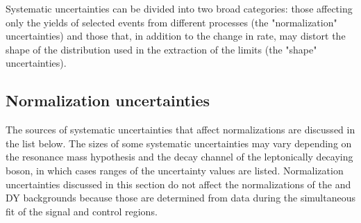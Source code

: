 Systematic uncertainties can be divided into two broad categories:
those affecting only the yields of selected events from different processes
(the "normalization" uncertainties) and those that, in addition to the change in rate, may
distort the shape of the \mTHH distribution used in the extraction of
the limits (the "shape" uncertainties). %

\subsection{Normalization uncertainties}


The sources of systematic
uncertainties that affect normalizations are discussed in the list below. The sizes of some
systematic uncertainties may vary depending on the resonance mass hypothesis
and the decay channel of the leptonically decaying \PZ boson, in which cases
ranges of the uncertainty values are listed. Normalization uncertainties
discussed in this section do not affect the normalizations of the \ttbar and DY
backgrounds because those are determined from data during the simultaneous fit of the signal and control regions.

